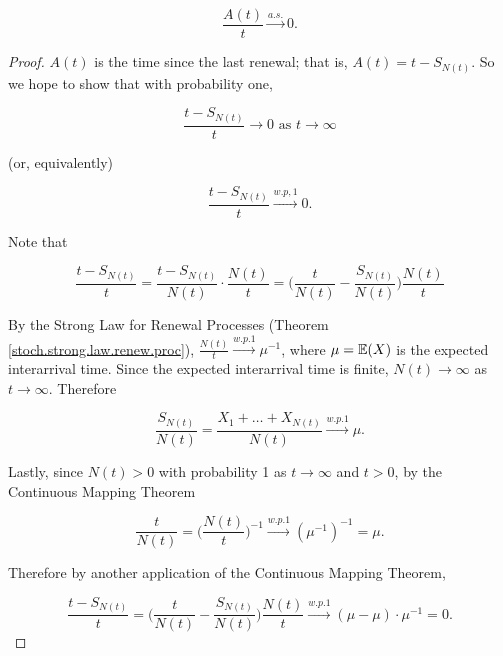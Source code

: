 \begin{proposition} 

\[
\frac{A(t)}{t} \xrightarrow{a.s.} 0.
\]

\end{proposition}

\begin{proof}

\(A(t)\) is the time since the last renewal; that is, \(A(t) = t - S_{N(t)}\). So we hope to show that with probability one,

\[
\frac{ t - S_{N(t)}}{t} \to 0 \text{ as } t \to \infty
\]

(or, equivalently)

\[
\frac{ t - S_{N(t)}}{t} \xrightarrow{w.p,1} 0 .
\]

Note that

\[
\frac{ t - S_{N(t)}}{t}  = \frac{ t - S_{N(t)}}{N(t)}  \cdot \frac{ N(t)}{t} =  \bigg(  \frac{ t}{N(t)} -  \frac{S_{N(t)}}{N(t)}     \bigg) \frac{ N(t)}{t} 
\]

By the Strong Law for Renewal Processes (Theorem \ref{stoch.strong.law.renew.proc}), \(\frac{ N(t)}{t} \xrightarrow{w.p.1} \mu^{-1}\), where \(\mu =\E(X)\) is the expected interarrival time. Since the expected interarrival time is finite, \(N(t) \to \infty\) as \(t \to \infty\). Therefore

\[
 \frac{S_{N(t)}}{N(t)} = \frac{X_1 + \ldots + X_{N(t)}}{N(t)} \xrightarrow{w.p.1} \mu.
\]

Lastly, since \(N(t) > 0 \) with probability 1 as \(t \to \infty\) and \(t > 0\), by the Continuous Mapping Theorem

\[
\frac{ t}{N(t)} =  \bigg( \frac{ N(t)}{t} \bigg)^{-1}  \xrightarrow{w.p.1} (\mu^{-1})^{-1} = \mu.
\]

Therefore by another application of the Continuous Mapping Theorem,

\[
\frac{ t - S_{N(t)}}{t} = \bigg(  \frac{ t}{N(t)} -  \frac{S_{N(t)}}{N(t)}     \bigg) \frac{ N(t)}{t}  \xrightarrow{w.p.1} ( \mu - \mu) \cdot \mu^{-1} = 0.
\]

\end{proof}

